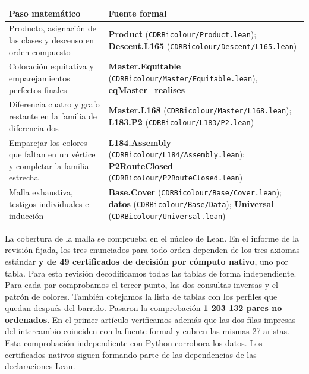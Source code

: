 \documentclass[spanish,11pt,a4paper]{article}
\begin{document}
{\begin{longtable}[]{@{}
  >{\raggedright\arraybackslash}p{}
  >{\raggedright\arraybackslash}p{}@{}}
\toprule\noalign{}
\begin{minipage}[b]{\linewidth}\raggedright
Paso matemático
\end{minipage} & \begin{minipage}[b]{\linewidth}\raggedright
Fuente formal
\end{minipage} \\
\midrule\noalign{}
\endhead
\bottomrule\noalign{}
\endlastfoot
Producto, asignación de las clases y descenso en orden compuesto & \textbf{Product} (\texttt{CDRBicolour/\allowbreak{}Product.\allowbreak{}lean}); \textbf{Descent.L165} (\texttt{CDRBicolour/\allowbreak{}Descent/\allowbreak{}L165.\allowbreak{}lean}) \\
Coloración equitativa y emparejamientos perfectos finales & \textbf{Master.Equitable} (\texttt{CDRBicolour/\allowbreak{}Master/\allowbreak{}Equitable.\allowbreak{}lean}), \textbf{eqMaster\_\allowbreak{}realises} \\
Diferencia cuatro y grafo restante en la familia de diferencia dos & \textbf{Master.L168} (\texttt{CDRBicolour/\allowbreak{}Master/\allowbreak{}L168.\allowbreak{}lean}); \textbf{L183.P2} (\texttt{CDRBicolour/\allowbreak{}L183/\allowbreak{}P2.\allowbreak{}lean}) \\
Emparejar los colores que faltan en un vértice y completar la familia estrecha & \textbf{L184.Assembly} (\texttt{CDRBicolour/\allowbreak{}L184/\allowbreak{}Assembly.\allowbreak{}lean}); \textbf{P2RouteClosed} (\texttt{CDRBicolour/\allowbreak{}P2Route\allowbreak{}Closed.\allowbreak{}lean}) \\
Malla exhaustiva, testigos individuales e inducción & \textbf{Base.Cover} (\texttt{CDRBicolour/\allowbreak{}Base/\allowbreak{}Cover.\allowbreak{}lean}); \textbf{datos} (\texttt{CDRBicolour/\allowbreak{}Base/\allowbreak{}Data}); \textbf{Universal} (\texttt{CDRBicolour/\allowbreak{}Universal.\allowbreak{}lean}) \\
\end{longtable}
}

La cobertura de la malla se comprueba en el núcleo de Lean. En el informe de la revisión fijada, los tres enunciados para todo orden dependen de los tres axiomas estándar \textbf{y de 49 certificados de decisión por cómputo nativo}, uno por tabla. Para esta revisión decodificamos todas las tablas de forma independiente. Para cada par comprobamos el tercer punto, las dos consultas inversas y el patrón de colores. También cotejamos la lista de tablas con los perfiles que quedan después del barrido. Pasaron la comprobación \textbf{1 203 132 pares no ordenados}. En el primer artículo verificamos además que las dos filas impresas del intercambio coinciden con la fuente formal y cubren las mismas 27 aristas. Esta comprobación independiente con Python corrobora los datos. Los certificados nativos siguen formando parte de las dependencias de las declaraciones Lean.
\end{document}
